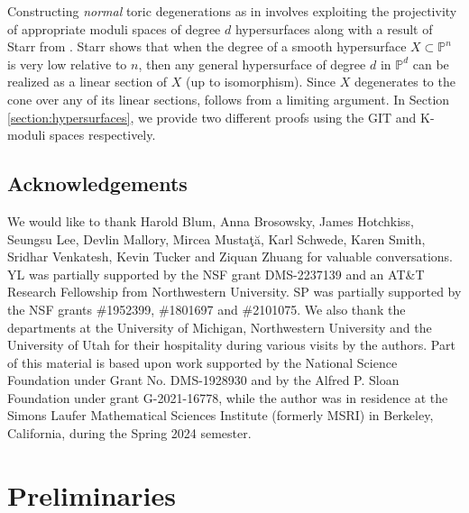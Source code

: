 \documentclass[11pt,reqno]{amsart}
\newcommand{\C}{\mathbb{C}}
\renewcommand{\P}{\mathbb{P}}
\numberwithin{equation}{section}
\theoremstyle{definition}
\newcommand{\s}{\mathscr{s}}
\begin{document}
 

Constructing \emph{normal} toric degenerations as in  involves exploiting the projectivity of appropriate moduli spaces of degree $d$ hypersurfaces along with a result of Starr from \cite{Sta06}. Starr shows that when the degree of a smooth hypersurface $X \subset \P^n $ is very low relative to $n$, then any general hypersurface of degree $d$ in $\P^d$ can be realized as a linear section of $X$ (up to isomorphism). Since $X$ degenerates to the cone over any of its linear sections,  follows from a limiting argument. In Section \ref{section:hypersurfaces}, we provide two different proofs using the GIT and K-moduli spaces respectively.







\subsection*{Acknowledgements}
We would like to thank Harold Blum, Anna Brosowsky, James Hotchkiss, Seungsu Lee, Devlin Mallory, Mircea Musta\c t\u a, Karl Schwede, Karen Smith, Sridhar Venkatesh, Kevin Tucker and Ziquan Zhuang for valuable conversations. YL was partially supported by the NSF grant DMS-2237139 and an AT\&T Research Fellowship from Northwestern University.
SP was partially supported by the NSF grants \#1952399, \#1801697 and \#2101075.
We also thank the departments at the University of Michigan, Northwestern University and the University of Utah for their hospitality during various visits by the authors.
Part of this material is based upon work supported by the National Science Foundation under Grant No. DMS-1928930 and by the Alfred P. Sloan Foundation under grant G-2021-16778, while the author was in residence at the Simons Laufer Mathematical Sciences Institute (formerly MSRI) in Berkeley, California, during the Spring 2024 semester.


\section{Preliminaries}
\end{document}

